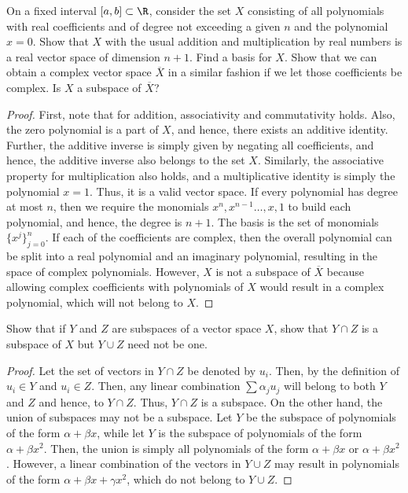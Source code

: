 \begin{question}
    On a fixed interval $[a,b] \subset \R$, consider the set $X$ consisting of all polynomials with real coefficients and of degree not exceeding a given $n$ and the polynomial $x = 0$. Show that $X$ with the usual addition and multiplication by real numbers is a real vector space of dimension $n+1.$ Find a basis for $X$. Show that we can obtain a complex vector space $\overline{X}$ in a similar fashion if we let those coefficients be complex. Is $X$ a subspace of $\overline{X}$?
    \label{section2.1-9}
\end{question}
\begin{proof}
    First, note that for addition, associativity and commutativity holds. Also, the zero polynomial is a part of $X$, and hence, there exists an additive identity. Further, the additive inverse is simply given by negating all coefficients, and hence, the additive inverse also belongs to the set $X$. Similarly, the associative property for multiplication also holds, and a multiplicative identity is simply the polynomial $x = 1.$ Thus, it is a valid vector space. If every polynomial has degree at most $n$, then we require the monomials $x^n , x^{n-1} \ldots , x , 1$ to build each polynomial, and hence, the degree is $n+1$. The basis is the set of monomials $\{x^j\}_{j=0}^n$. If each of the coefficients are complex, then the overall polynomial can be split into a real polynomial and an imaginary polynomial, resulting in the space of complex polynomials. However, $X$ is not a subspace of $\overline{X}$ because allowing complex coefficients with polynomials of $X$ would result in a complex polynomial, which will not belong to $X$.
\end{proof}

\begin{question}
    Show that if $Y$ and $Z$ are subspaces of a vector space $X$, show that $Y \cap Z$ is a subspace of $X$ but $Y \cup Z$ need not be one.
    \label{section2.1-10}
\end{question}
\begin{proof}
    Let the set of vectors in $Y \cap Z$ be denoted by $u_i$. Then, by the definition of $u_i \in Y$ and $u_i \in Z$. Then, any linear combination $\sum \alpha_j u_j$ will belong to both $Y$ and $Z$ and hence, to $Y \cap Z$. Thus, $Y \cap Z$ is a subspace. On the other hand, the union of subspaces may not be a subspace. Let $Y$ be the subspace of polynomials of the form $\alpha + \beta x$, while let $Y$ is the subspace of polynomials of the form $\alpha + \beta x^2$. Then, the union is simply all polynomials of the form $\alpha + \beta x$ or $\alpha + \beta x^2$. However, a linear combination of the vectors in $Y \cup Z$ may result in polynomials of the form $\alpha + \beta x + \gamma x^2$, which do not belong to $Y \cup Z.$
\end{proof}

